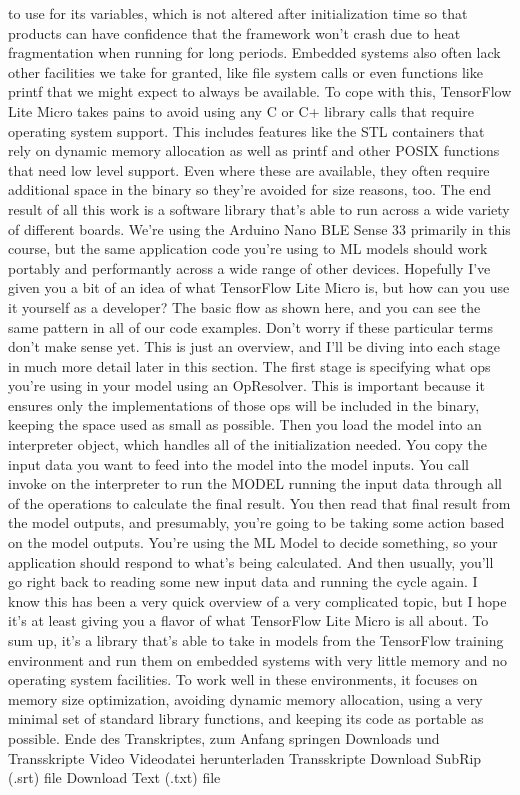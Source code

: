 to use for its variables, which is not altered after initialization time
so that products can have confidence that the framework won't
crash due to heat fragmentation when running for long periods.
Embedded systems also often lack other facilities
we take for granted, like file system calls or even functions like printf
that we might expect to always be available.
To cope with this, TensorFlow Lite Micro takes pains to avoid using any C or C+
library calls that require operating system support.
This includes features like the STL containers
that rely on dynamic memory allocation as well as printf and other POSIX
functions that need low level support.
Even where these are available, they often
require additional space in the binary so they're avoided for size reasons,
too.
The end result of all this work is a software library
that's able to run across a wide variety of different boards.
We're using the Arduino Nano BLE Sense 33 primarily in this course,
but the same application code you're using to ML models
should work portably and performantly across a wide range of other devices.
Hopefully I've given you a bit of an idea of what TensorFlow Lite Micro is,
but how can you use it yourself as a developer?
The basic flow as shown here, and you can see the same pattern
in all of our code examples.
Don't worry if these particular terms don't make sense yet.
This is just an overview, and I'll be diving
into each stage in much more detail later in this section.
The first stage is specifying what ops you're using in your model
using an OpResolver.
This is important because it ensures only the implementations of those ops
will be included in the binary, keeping the space used as small as possible.
Then you load the model into an interpreter object, which handles
all of the initialization needed.
You copy the input data you want to feed into the model into the model inputs.
You call invoke on the interpreter to run the MODEL running the input
data through all of the operations to calculate the final result.
You then read that final result from the model outputs,
and presumably, you're going to be taking some action based on the model
outputs.
You're using the ML Model to decide something,
so your application should respond to what's being calculated.
And then usually, you'll go right back to reading some new input data
and running the cycle again.
I know this has been a very quick overview of a very complicated topic,
but I hope it's at least giving you a flavor of what TensorFlow Lite
Micro is all about.
To sum up, it's a library that's able to take in models from the TensorFlow
training environment and run them on embedded systems
with very little memory and no operating system facilities.
To work well in these environments, it focuses on memory size optimization,
avoiding dynamic memory allocation, using
a very minimal set of standard library functions,
and keeping its code as portable as possible.
Ende des Transkriptes, zum Anfang springen
Downloads und Transskripte
Video
Videodatei herunterladen
Transskripte
Download SubRip (.srt) file
Download Text (.txt) file

